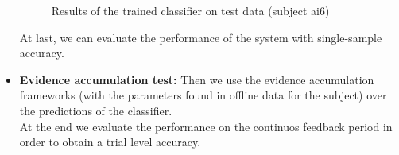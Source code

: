 \begin{itemize}
\begin{figure}[h!]
	 \caption{Results of the trained classifier on test data (subject ai6)}
	 \label{fig:test_results_ai6}
\end{figure}

At last, we can evaluate the performance of the system with single-sample accuracy.
\item \textbf{Evidence accumulation test:} Then we use the evidence accumulation frameworks (with the parameters found in offline data for the subject) over the predictions of the classifier.\\
At the end we evaluate the performance on the continuos feedback period in order to obtain a trial level accuracy.
\end{itemize}